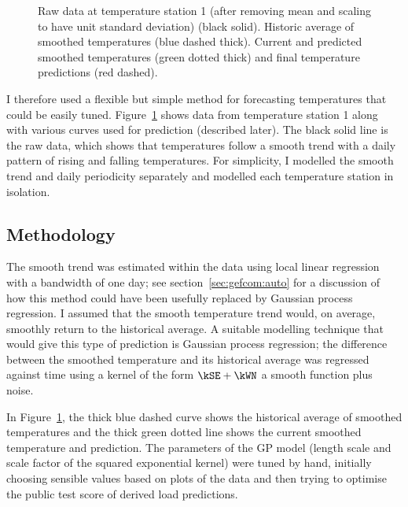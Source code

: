 \begin{figure}[ht]
  \begin{center}
    
  \end{center}
  \caption[Modelling of temperature data.]{Raw data at temperature station 1 (after removing mean and scaling to have unit standard deviation) (black solid). Historic average of smoothed temperatures (blue dashed thick). Current and predicted smoothed temperatures (green dotted thick) and final temperature predictions (red dashed).}
  \label{fig:temp_pred}
\end{figure}

I therefore used a flexible but simple method for forecasting temperatures that could be easily tuned.
Figure~\ref{fig:temp_pred} shows data from temperature station 1 along with various curves used for prediction (described later).
The black solid line is the raw data, which shows that temperatures follow a smooth trend with a daily pattern of rising and falling temperatures.
For simplicity, I modelled the smooth trend and daily periodicity separately and modelled each temperature station in isolation.

\subsection{Methodology}

The smooth trend was estimated within the data using local linear regression \citep[e.g. chapter 6 of][]{Hastie2009-hj} with a bandwidth of one day; see section~\ref{sec:gefcom:auto} for a discussion of how this method could have been usefully replaced by Gaussian process regression.
I assumed that the smooth temperature trend would, on average, smoothly return to the historical average.
A suitable modelling technique that would give this type of prediction is Gaussian process regression; the difference between the smoothed temperature and its historical average was regressed against time using a kernel of the form $\kSE + \kWN$ \ie a smooth function plus noise.

In Figure~\ref{fig:temp_pred}, the thick blue dashed curve shows the historical average of smoothed temperatures and the thick green dotted line shows the current smoothed temperature and prediction.
The parameters of the GP model (length scale and scale factor of the squared exponential kernel) were tuned by hand, initially choosing sensible values based on plots of the data and then trying to optimise the public test score of derived load predictions.

